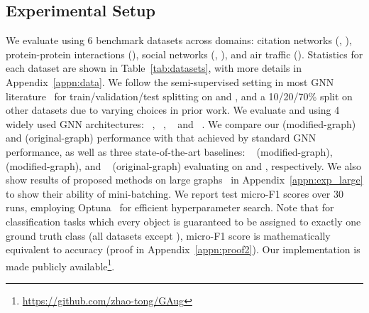 \documentclass[letterpaper]{article} \usepackage{aaai21}  \usepackage{times}  \usepackage{helvet} \usepackage{courier}  \usepackage[hyphens]{url}  \usepackage{graphicx} \urlstyle{rm} \def\UrlFont{\rm}  \usepackage{natbib}  \usepackage{caption} \frenchspacing  \setlength{\pdfpagewidth}{8.5in}  \setlength{\pdfpageheight}{11in}
\begin{document}
\subsection{Experimental Setup}
We evaluate using 6 benchmark datasets across domains: citation networks (\cora, \citeseer \cite{kipf2016semi}), protein-protein interactions (\ppi \cite{hamilton2017inductive}), social networks (\blogc, \flickr \cite{huang2017label}), and air traffic (\airusa \cite{wu2019net}). Statistics for each dataset are shown in Table~\ref{tab:datasets}, with more details in Appendix~\ref{appn:data}.
We follow the semi-supervised setting in most GNN literature~\cite{kipf2016semi, velivckovic2017graph} for train/validation/test splitting on \cora and \citeseer, and a 10/20/70\% split on other datasets due to varying choices in prior work.  We evaluate \methodtwo and \method using 4 widely used GNN architectures:
\gcn~\cite{kipf2016semi}, \gsage~\cite{hamilton2017inductive}, \gat~\cite{velivckovic2017graph} and \jknet~\cite{xu2018representation}. We compare our \methodtwo (modified-graph) and \method (original-graph) performance with that achieved by standard GNN performance, as well as three state-of-the-art baselines: \adaedge~\cite{chen2019measuring} (modified-graph), \bgcn~\cite{zhang2019bayesian} (modified-graph), and \dropedge~\cite{rong2019dropedge} (original-graph) evaluating on  and , respectively. We also show results of proposed \methodshared methods on large graphs~\cite{hu2020open} in Appendix~\ref{appn:exp_large} to show their ability of mini-batching. We report test micro-F1 scores over 30 runs, employing Optuna~\cite{akiba2019optuna} for efficient hyperparameter search. Note that for classification tasks which every object is guaranteed to be assigned to exactly one ground truth class (all datasets except \ppi), micro-F1 score is mathematically equivalent to accuracy (proof in Appendix~\ref{appn:proof2}).
Our implementation is made publicly available\footnote{\url{https://github.com/zhao-tong/GAug}}.
\end{document}
